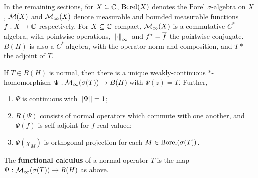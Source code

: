 \documentclass[10pt]{amsart}
\begin{document}
In the remaining sections, for $X \subseteq \mathbb{C}$, $\operatorname{Borel}(X)$ denotes the Borel $\sigma$-algebra on $X$, $\mathcal{M}(X)$ and $\mathcal{M}_\infty(X)$ denote measurable and bounded measurable functions $f : X \to \mathbb{C}$ respectively. For $X \subseteq \mathbb{C}$ compact, $\mathcal{M}_\infty(X)$ is a commutative $C^*$-algebra, with pointwise operations, $\left\| \cdot \right\|_\infty$, and $f^* = \overline{f}$ the pointwise conjugate. $B(H)$ is also a $C^*$-algebra, with the operator norm and composition, and $T*$ the adjoint of $T$.
\begin{proposition}\label{funccalc}
    If $T \in B(H)$ is normal, then there is a unique weakly-continuous $*$-homomorphism $\Psi : \mathcal{M}_\infty(\sigma(T)) \to B(H)$ with $\Psi(z) = T$. Further, 
    \begin{enumerate}
        \item $\Psi$ is continuous with $\left\| \Psi \right\| = 1$;
        \item $R(\Psi)$ consists of normal operators which commute with one another, and $\Psi(f)$ is self-adjoint for $f$ real-valued;
        \item $\Psi(\chi_M)$ is orthogonal projection for each $M \in \operatorname{Borel}(\sigma(T))$.
    \end{enumerate}
\end{proposition}
\begin{definition}
    The \textbf{functional calculus} of a normal operator $T$ is the map $\Psi : \mathcal{M}_\infty(\sigma(T)) \to B(H)$ as above.
\end{definition}



\end{document}
